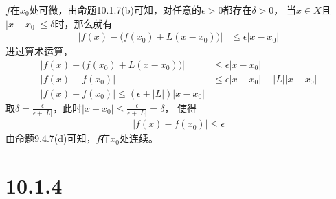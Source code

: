 \documentclass{article}
\begin{document}
\begin{itemize}
        $f$在$x_0$处可微，由命题10.1.7(b)可知，对任意的$\epsilon > 0$都存在$\delta > 0$，
        当$x \in X$且$|x - x_0| \leq \delta$时，那么就有
        \begin{align*}
          |f(x) - \big( f(x_0) + L(x-x_0) \big)| & \leq \epsilon |x - x_0|
        \end{align*}
        进过算术运算，
        \begin{align*}
          |f(x) - \big( f(x_0) + L(x-x_0) \big)| & \leq \epsilon |x - x_0|                \\
          |f(x) - f(x_0)|                        & \leq \epsilon |x - x_0| + |L||x - x_0| \\
          |f(x) - f(x_0)| \leq (\epsilon + |L|)|x - x_0|
        \end{align*}
        取$\delta = \frac{\epsilon}{\epsilon + |L|}$，此时$|x - x_0| \leq \frac{\epsilon}{\epsilon + |L|} = \delta$，
        使得
        \begin{align*}
          |f(x) - f(x_0)| \leq \epsilon
        \end{align*}
        由命题9.4.7(d)可知，$f$在$x_0$处连续。
\end{itemize}

\section*{10.1.4}
\end{document}
